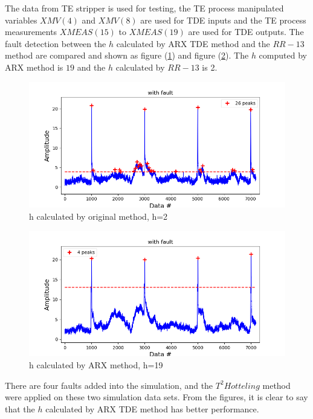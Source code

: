 \documentclass[letterpaper, 12 pt, Journal, onecolumn]{ieeeconf}  %
\begin{document}
The data from TE stripper is used for testing, the TE process manipulated variables $XMV(4)$ and $XMV(8)$ are used for TDE inputs and the TE process measurements $XMEAS(15)$ to $XMEAS(19)$ are used for TDE outputs. The fault detection between the $h$ calculated by ARX TDE method and the $RR-13$\cite{RR13} method are compared and shown as figure (\ref{fig:h_2}) and figure (\ref{fig:h_ARX}).  The $h$ computed by ARX method is $19$ and the $h$ calculated by $RR-13$ is 2.
\begin{figure}
	\begin{center}
	\includegraphics[scale=0.5]{2h_T2.png}
	\caption{h calculated by original method, h=2}
	\label{fig:h_2}
	\end{center}
\end{figure}

\begin{figure}
	\begin{center}
	\includegraphics[scale=0.5]{ARX_TDE.png}
	\caption{h calculated by ARX method, h=19}
	\end{center}
	\label{fig:h_ARX}
\end{figure}

There are four faults added into the simulation, and the $T^2 Hotteling$ method were applied on these two simulation data sets. From the figures, it is clear to say that the $h$ calculated by ARX TDE method has better performance.
\end{document}
